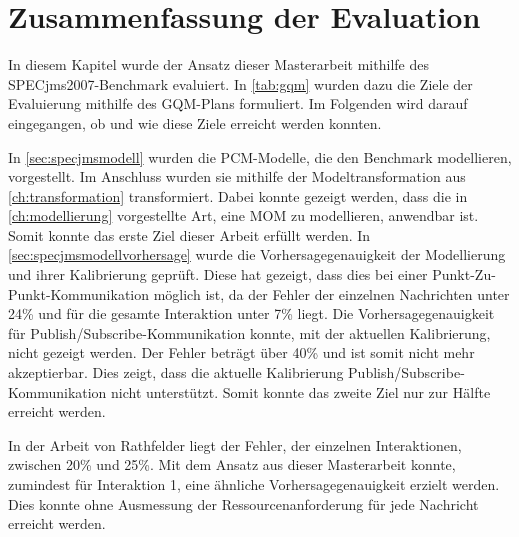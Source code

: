\section{Zusammenfassung der Evaluation}
\label{sec:evaluationzusammenfassung}
In diesem Kapitel wurde der Ansatz dieser Masterarbeit mithilfe des SPECjms2007-Benchmark evaluiert. In \autoref{tab:gqm} wurden dazu die Ziele der Evaluierung mithilfe des GQM-Plans formuliert. Im Folgenden wird darauf eingegangen, ob und wie diese Ziele erreicht werden konnten. \par
In \autoref{sec:specjmsmodell} wurden die PCM-Modelle, die den Benchmark modellieren, vorgestellt. Im Anschluss wurden sie mithilfe der Modeltransformation aus \autoref{ch:transformation} transformiert. Dabei konnte gezeigt werden, dass die in \autoref{ch:modellierung} vorgestellte Art, eine MOM zu modellieren, anwendbar ist. Somit konnte das erste Ziel dieser Arbeit erfüllt werden. 
In \autoref{sec:specjmsmodellvorhersage} wurde die Vorhersagegenauigkeit der Modellierung und ihrer Kalibrierung geprüft. Diese hat gezeigt, dass dies bei einer Punkt-Zu-Punkt-Kommunikation möglich ist, da der Fehler der einzelnen Nachrichten unter 24\% und für die gesamte Interaktion unter 7\% liegt. Die Vorhersagegenauigkeit für Publish/Subscribe-Kommunikation konnte, mit der aktuellen Kalibrierung, nicht gezeigt werden. Der Fehler beträgt über 40\% und ist somit nicht mehr akzeptierbar. Dies zeigt, dass die aktuelle Kalibrierung Publish/Subscribe-Kommunikation nicht unterstützt. Somit konnte das zweite Ziel nur zur Hälfte erreicht werden. \par
In der Arbeit von Rathfelder \cite{Rathfelder2013} liegt der Fehler, der einzelnen Interaktionen, zwischen 20\% und 25\%. Mit dem Ansatz aus dieser Masterarbeit konnte, zumindest für Interaktion 1, eine ähnliche Vorhersagegenauigkeit erzielt werden. Dies konnte ohne Ausmessung der Ressourcenanforderung für jede Nachricht erreicht werden.



